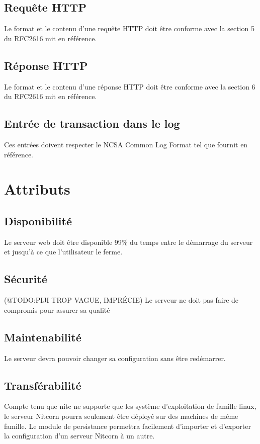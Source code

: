 \documentclass{scrreprt}
\begin{document}
\subsection{Requête HTTP}
Le format et le contenu d'une requête HTTP doit être conforme avec la section 5 du RFC2616\cite{http1.0} mit en référence.
\subsection{Réponse HTTP}
Le format et le contenu d'une réponse HTTP doit être conforme avec la section 6 du RFC2616\cite{http1.0} mit en référence.
\subsection{Entrée de transaction dans le log}
Ces entrées doivent respecter le NCSA Common Log Format\cite{NCSA} tel que fournit en référence.



\section{Attributs}
\subsection{Disponibilité}
Le serveur web doit être disponible 99\% du temps entre le démarrage du serveur et jusqu'à ce que l'utilisateur le ferme.
\subsection{Sécurité}
(@TODO:PIJI TROP VAGUE, IMPRÉCIE)
Le serveur ne doit pas faire de compromis pour assurer sa qualité
\subsection{Maintenabilité}
Le serveur devra pouvoir changer sa configuration sans être redémarrer.
\subsection{Transférabilité} 
Compte tenu que nitc ne supporte que les système d'exploitation de famille linux, le serveur Nitcorn pourra seulement être déployé
sur des machines de même famille. 
Le module de persistance permettra facilement d'importer et d'exporter la configuration d'un serveur Nitcorn à un autre.
\end{document}
